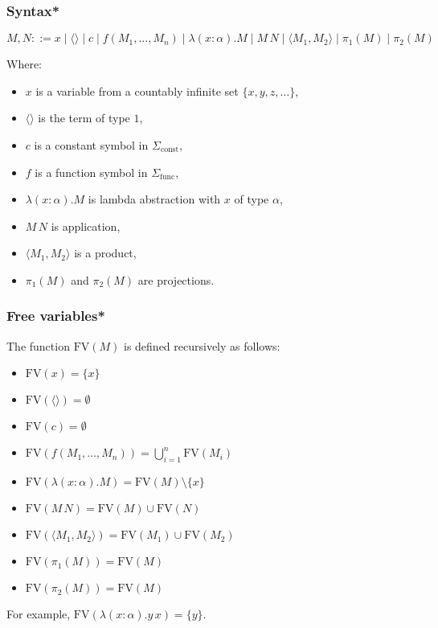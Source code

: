 \documentclass[aspectratio=169]{beamer}
\begin{document}
\begin{frame}
\frametitle{Syntax*}

\[
M, N ::= x \mid \langle \rangle \mid c \mid f(M_1, \ldots, M_n) \mid \lambda (x: \alpha). M \mid M \, N \mid \langle M_1, M_2 \rangle \mid \pi_1(M) \mid \pi_2(M)
\]

Where:
\begin{itemize}
    \item $x$ is a variable from a countably infinite set $\{x, y, z, \ldots \}$,
    \item $\langle \rangle$ is the term of type $1$,
    \item $c$ is a constant symbol in $\Sigma_{\text{const}}$,
    \item $f$ is a function symbol in $\Sigma_{\text{func}}$,
    \item $\lambda (x: \alpha). M$ is lambda abstraction with $x$ of type $\alpha$,
    \item $M\, N$ is application,
    \item $\langle M_1, M_2 \rangle$ is a product,
    \item $\pi_1(M)$ and $\pi_2(M)$ are projections.
\end{itemize}
\end{frame}

\begin{frame}
\frametitle{Free variables*}
The function $\text{FV}(M)$ is defined recursively as follows:
\begin{itemize}
    \item $\text{FV}(x) = \{x\}$
    \item $\text{FV}(\langle \rangle) = \emptyset$
    \item $\text{FV}(c) = \emptyset$
    \item $\text{FV}(f(M_1, \ldots, M_n)) = \bigcup_{i=1}^{n} \text{FV}(M_i)$
    \pause
    \item $\text{FV}(\lambda (x: \alpha). M) = \text{FV}(M) \setminus \{x\}$
    \pause
    \item $\text{FV}(M \, N) = \text{FV}(M) \cup \text{FV}(N)$
    \item $\text{FV}(\langle M_1, M_2 \rangle) = \text{FV}(M_1) \cup \text{FV}(M_2)$
    \item $\text{FV}(\pi_1(M)) = \text{FV}(M)$
    \item $\text{FV}(\pi_2(M)) = \text{FV}(M)$
\end{itemize}

\pause
For example, $\text{FV}(\lambda (x: \alpha). y \, x) = \{y\}$.

\end{frame}
\end{document}
